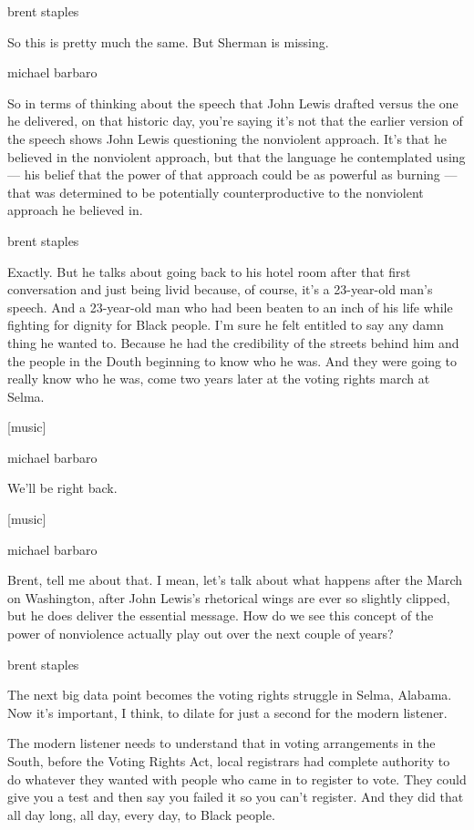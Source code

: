 brent staples

So this is pretty much the same. But Sherman is missing.

michael barbaro

So in terms of thinking about the speech that John Lewis drafted versus
the one he delivered, on that historic day, you're saying it's not that
the earlier version of the speech shows John Lewis questioning the
nonviolent approach. It's that he believed in the nonviolent approach,
but that the language he contemplated using --- his belief that the
power of that approach could be as powerful as burning --- that was
determined to be potentially counterproductive to the nonviolent
approach he believed in.

brent staples

Exactly. But he talks about going back to his hotel room after that
first conversation and just being livid because, of course, it's a
23-year-old man's speech. And a 23-year-old man who had been beaten to
an inch of his life while fighting for dignity for Black people. I'm
sure he felt entitled to say any damn thing he wanted to. Because he had
the credibility of the streets behind him and the people in the Douth
beginning to know who he was. And they were going to really know who he
was, come two years later at the voting rights march at Selma.

{[}music{]}

michael barbaro

We'll be right back.

{[}music{]}

michael barbaro

Brent, tell me about that. I mean, let's talk about what happens after
the March on Washington, after John Lewis's rhetorical wings are ever so
slightly clipped, but he does deliver the essential message. How do we
see this concept of the power of nonviolence actually play out over the
next couple of years?

brent staples

The next big data point becomes the voting rights struggle in Selma,
Alabama. Now it's important, I think, to dilate for just a second for
the modern listener.

The modern listener needs to understand that in voting arrangements in
the South, before the Voting Rights Act, local registrars had complete
authority to do whatever they wanted with people who came in to register
to vote. They could give you a test and then say you failed it so you
can't register. And they did that all day long, all day, every day, to
Black people.

